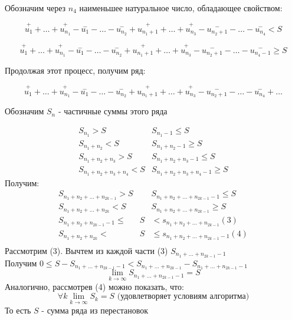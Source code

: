 \documentclass[12pt]{article}
\let\oldlim\lim
\renewcommand{\lim}{\oldlim\limits}
\begin{document}
\begin{adjustwidth}{1.5em}{1.5em}
    Обозначим через $n_4$ наименьшее натуральное число, обладающее свойством:

    \[\overset{+}{u_1}+\dots+\overset{+}{u_{n_1}}-\overset{-}{u_1}-\dots-\overset{-}{u_{n_2}}+\overset{+}{u_{n_1+1}}+\dots+\overset{+}{u_{n_3}}-\overset{-}{u_{n_2+1}}-\dots-\overset{-}{u_{n_4}} < S\]

    \[\overset{+}{u_1}+\dots+\overset{+}{u_{n_1}}-\overset{-}{u_1}-\dots-\overset{-}{u_{n_2}}+\overset{+}{u_{n_1+1}}+\dots+\overset{+}{u_{n_3}}-\overset{-}{u_{n_2+1}}-\dots-\overset{-}{u_{n_4-1}} \geq S\]
    

    Продолжая этот процесс, получим ряд:

    \[\overset{+}{u_1}+\dots+\overset{+}{u_{n_1}}-\overset{-}{u_1}-\dots-\overset{-}{u_{n_2}}+\overset{+}{u_{n_1+1}}+\dots+\overset{+}{u_{n_3}}-\overset{-}{u_{n_2+1}}-\dots-\overset{-}{u_{n_4}}+\dots\]
  
    Обозначим $S_n$ - частичные суммы этого ряда

    \[\begin{matrix}
      S_{n_1}>S & S_{n_1-1}\leq S\\
      S_{n_1+n_2}<S & S_{n_1+n_2-1}\geq S\\
      S_{n_1+n_2+n_3} > S & S_{n_1+n_2+n_3-1} \leq S\\
      S_{n_1+n_2+n_3+n_4} < S & S_{n_1+n_2+n_3+n_4-1} \geq S
    \end{matrix}\]
    Получим:
    \[\begin{matrix}
      S_{n_1+n_2+\dots+n_{2k-1}} > S & & S_{n_1+n_2+\dots+n_{2k-1}-1} \leq S\\
      S_{n_1+n_2+\dots+n_{2k}} < S & &  S_{n_1+n_2+\dots+n_{2k-1}} \geq S\\
      S_{n_1+n_2+n_{2k-1}-1} \leq & S & < s_{n_1+n_2+\dots+n_{2k-1}}(3)\\
      S_{n_1+n_2+n_{2k}} < & S & \leq s_{n_1+n_2+\dots+n_{2k-1}-1}(4)\\
    \end{matrix}\]
    Рассмотрим (3). Вычтем из каждой части (3) $S_{n_1+\dots+n_{2k-1}-1}$\\
    Получим $0\leq S - S_{n_1+\dots+n_{2k-1}-1} < S_{n_1+\dots+n_{2k-1}} - S_{n_1+\dots+n_{2k-1}-1}$
    \[\lim_{k \to \infty} S_{n_1+\dots+n_{2k-1}-1} = S\]
    Аналогично, рассмотрев (4) можно показать, что:
    \[\forall k \lim_{k \to \infty} S_k =S \text{ (удовлетворяет условиям алгоритма)}\]
    То есть $S$ - сумма ряда из перестановок
  \end{adjustwidth}
\end{document}

